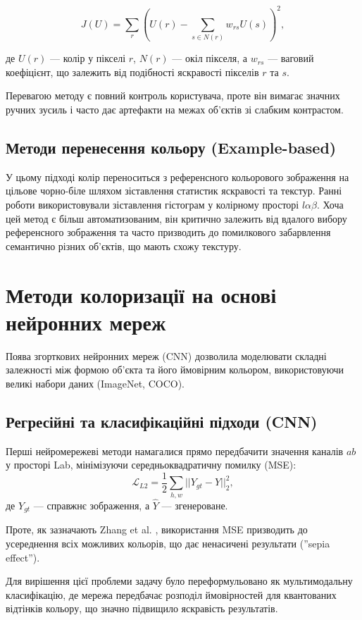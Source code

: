        $$ J(U) = \sum_{r} \left( U(r) - \sum_{s \in N(r)} w_{rs} U(s) \right)^2, $$

        де $ U(r)$ — колір у пікселі $r$, $N(r)$ — окіл пікселя, а $w_{rs}$ — ваговий коефіцієнт, що залежить від подібності яскравості пікселів $r$ та $s$.

        Перевагою методу є повний контроль користувача, проте він вимагає значних ручних зусиль і часто дає артефакти на межах об'єктів зі слабким контрастом.

    \subsection{Методи перенесення кольору (Example-based)}
        У цьому підході колір переноситься з референсного кольорового зображення на цільове чорно-біле шляхом зіставлення статистик яскравості та текстур.
        Ранні роботи використовували зіставлення гістограм у колірному просторі $l\alpha\beta$.
        Хоча цей метод є більш автоматизованим, він критично залежить від вдалого вибору референсного зображення та часто призводить до помилкового забарвлення семантично різних об'єктів, що мають схожу текстуру.

\section{Методи колоризації на основі нейронних мереж}

    Поява згорткових нейронних мереж (CNN) дозволила моделювати складні залежності між формою об'єкта та його ймовірним кольором, використовуючи великі набори даних (ImageNet, COCO).

    \subsection{Регресійні та класифікаційні підходи (CNN)}
        Перші нейромережеві методи намагалися прямо передбачити значення каналів $ab$ у просторі Lab, мінімізуючи середньоквадратичну помилку (MSE):
        $$ \mathcal{L}_{L2} = \frac{1}{2} \sum_{h,w} || Y_{gt} - \hat{Y} ||_2^2, $$
        де $Y_{gt}$ — справжнє зображення, а $\hat{Y}$ — згенероване.

        Проте, як зазначають Zhang et al. \cite{2016-colorful-image-colorization}, використання MSE призводить до усереднення всіх можливих кольорів, що дає ненасичені результати (''sepia effect'').

        Для вирішення цієї проблеми задачу було переформульовано як мультимодальну класифікацію, де мережа передбачає розподіл ймовірностей для квантованих відтінків кольору, що значно підвищило яскравість результатів.


